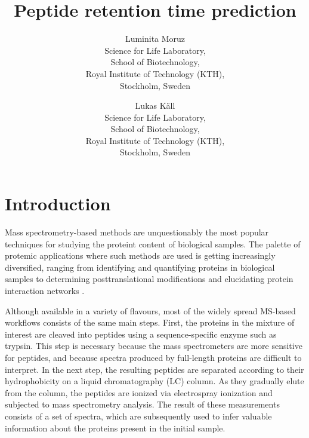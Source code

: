 \documentclass[a4paper]{article}
\title{Peptide retention time prediction}
\author{
Luminita Moruz\\
Science for Life Laboratory,\\
School of Biotechnology,\\
Royal Institute of Technology (KTH),\\
Stockholm, Sweden
\and
Lukas K\"all\\
Science for Life Laboratory,\\
School of Biotechnology,\\
Royal Institute of Technology (KTH),\\
Stockholm, Sweden}
\begin{document}
\maketitle

\setcounter{secnumdepth}{2} %
\setcounter{tocdepth}{2}    %
\tableofcontents            %



\section{Introduction}
Mass spectrometry-based methods are unquestionably the most popular techniques for studying the proteint content of biological samples. The palette of protemic applications where such methods are used is getting increasingly diversified, ranging from identifying and quantifying
proteins in biological samples \cite{Geiger2012} to determining
posttranslational modifications \cite{Huttlin2010} and elucidating
protein interaction networks \cite{Gavin2011}. 

\vspace{0.15cm}

Although available in a variety of flavours, most of the widely spread MS-based workflows consists of the same main steps. First, the proteins in the mixture of interest are cleaved into peptides using a sequence-specific enzyme such as trypsin. This step is necessary because the mass spectrometers are more sensitive for peptides, and because spectra produced by full-length proteins are difficult to interpret. In the next step, the resulting peptides are separated according to their hydrophobicity on a liquid chromatography (LC) column. As they gradually elute from the column, the peptides are ionized via electrospray ionization and subjected to mass spectrometry analysis. The result of these measurements consists of a set of spectra, which are subsequently used to infer valuable information about the proteins present in the initial sample.

\vspace{0.15cm}
\end{document}
